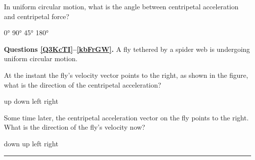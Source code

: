 \documentclass[answers]{exam}
\begin{document}
\begin{questions}
\question
In uniform circular motion, what is the angle between centripetal acceleration and centripetal force?

\begin{randomizechoices}
    \correctchoice \ang{0}
    \choice \ang{90}
    \choice \ang{45}
    \choice \ang{180}
\end{randomizechoices}

\begin{EnvUplevel}
    \textbf{Questions \ref{Q3KcTI}--\ref{kbFrGW}.} A fly tethered by a spider web is undergoing uniform circular motion.
\end{EnvUplevel}

\begin{center}
\end{center}

\question \label{Q3KcTI}
At the instant the fly's velocity vector points to the right, as shown in the figure, what is the direction of the centripetal acceleration?

 \begin{randomizechoices}
    \correctchoice up
    \choice down
    \choice left
    \choice right
\end{randomizechoices}


\question \label{kbFrGW}
Some time later, the centripetal acceleration vector on the fly points to the right. What is the direction of the fly's velocity now?

\begin{randomizechoices}
    \correctchoice down
    \choice up
    \choice left    
    \choice right
\end{randomizechoices}

\vspace{1em}

\hrule

\clearpage


\end{questions}
\end{document}
